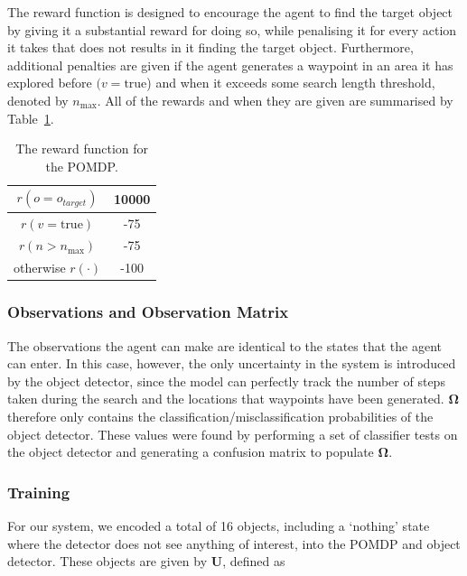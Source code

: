 \documentclass[runningheads]{llncs}
\begin{document}
The reward function is designed to encourage the agent to find the target object by giving it a substantial reward for doing so, while penalising it for every action it takes that does not results in it finding the target object.
Furthermore, additional penalties are given if the agent generates a waypoint in an area it has explored before $(v = \textrm{true}$) and when it exceeds some search length threshold, denoted by $n_{\max}$.
All of the rewards and when they are given are summarised by Table~\ref{tab:rewards}.

\begin{table}
  \centering
  \caption{The reward function for the POMDP. }\label{tab:rewards}
  \begin{tabular}{cc}
    \toprule
    $r(o = o_{target})$ & 10000 \\ \midrule
    $r(v = \textrm{true})$  & -75 \\ \midrule
    $r(n > n_{\max})$ & -75 \\ \midrule
    otherwise $r(\cdot)$ & -100  \\ \midrule
    \bottomrule
  \end{tabular}
\end{table}

\subsubsection{Observations and Observation Matrix}

The observations the agent can make are identical to the states that the agent can enter. 
In this case, however, the only uncertainty in the system is introduced by the object detector, since the model can perfectly track the number of steps taken during the search and the locations that waypoints have been generated.
$\mathbf{\Omega}$ therefore only contains the classification/misclassification probabilities of the object detector. 
These values were found by performing a set of classifier tests on the object detector and generating a confusion matrix to populate $\mathbf{\Omega}$.

\subsubsection{Training}

For our system, we encoded a total of 16 objects, including a `nothing' state where the detector does not see anything of interest, into the POMDP and object detector. These objects are given by $\mathbf{U}$, defined as 
\end{document}
